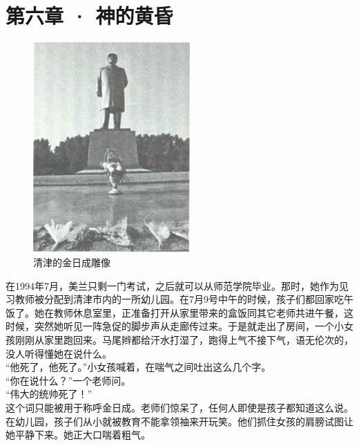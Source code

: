 \fancyhead[RO]{\thepage}
\fancyhead[LE]{\thepage}
\fancyfoot[LE,RO]{}
\fancyfoot[LO,CE]{}
\fancyfoot[CO,RE]{}
\chapter*{第六章 · 神的黄昏}
\begin{figure}[!htbp]
	\centering
	\includegraphics[width=6cm]{./Chapters/Images/06.jpg}
	\caption*{清津的金日成雕像}
\end{figure}


在1994年7月，美兰只剩一门考试，之后就可以从师范学院毕业。那时，她作为见习教师被分配到清津市内的一所幼儿园。在7月9号中午的时候，孩子们都回家吃午饭了。她在教师休息室里，正准备打开从家里带来的盒饭同其它老师共进午餐，这时候，突然她听见一阵急促的脚步声从走廊传过来。于是就走出了房间，一个小女孩刚刚从家里跑回来。马尾辫都给汗水打湿了，跑得上气不接下气，语无伦次的，没人听得懂她在说什么。\\

“他死了，他死了。”小女孩喊着，在喘气之间吐出这么几个字。\\

“你在说什么？”一个老师问。\\

“伟大的统帅死了！”\\

这个词只能被用于称呼金日成。老师们惊呆了，任何人即使是孩子都知道这么说。在幼儿园，孩子们从小就被教育不能拿领袖来开玩笑。他们抓住女孩的肩膀试图让她平静下来。她正大口喘着粗气。\\

